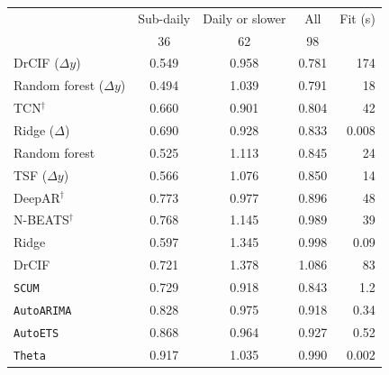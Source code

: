 \begin{tabular}{lcccr}
\toprule
 & Sub-daily & Daily or slower & All & Fit (s) \\
 & 36 & 62 & 98 & \\
\midrule
DrCIF ($\Delta y$)         & 0.549 & 0.958 & 0.781 & 174 \\
Random forest ($\Delta y$) & 0.494 & 1.039 & 0.791 & 18 \\
TCN$^\dagger$              & 0.660 & 0.901 & 0.804 & 42 \\
Ridge ($\Delta$)           & 0.690 & 0.928 & 0.833 & 0.008 \\
Random forest              & 0.525 & 1.113 & 0.845 & 24 \\
TSF ($\Delta y$)           & 0.566 & 1.076 & 0.850 & 14 \\
DeepAR$^\dagger$           & 0.773 & 0.977 & 0.896 & 48 \\
N-BEATS$^\dagger$          & 0.768 & 1.145 & 0.989 & 39 \\
Ridge                      & 0.597 & 1.345 & 0.998 & 0.09 \\
DrCIF                      & 0.721 & 1.378 & 1.086 & 83 \\
\midrule
\texttt{SCUM}              & 0.729 & 0.918 & 0.843 & 1.2 \\
\texttt{AutoARIMA}         & 0.828 & 0.975 & 0.918 & 0.34 \\
\texttt{AutoETS}           & 0.868 & 0.964 & 0.927 & 0.52 \\
\texttt{Theta}             & 0.917 & 1.035 & 0.990 & 0.002 \\
\bottomrule
\end{tabular}
